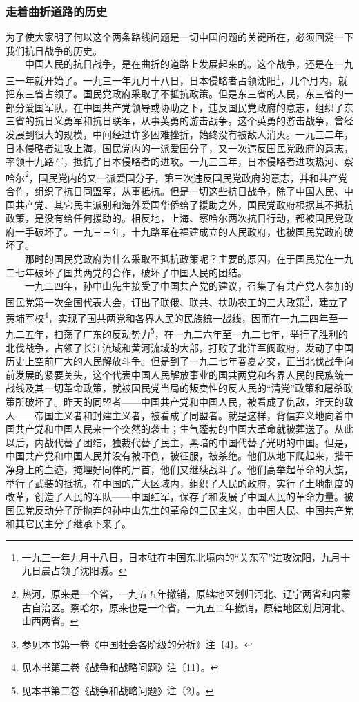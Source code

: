 \documentclass[cn,11pt,chinese]{elegantbook}
\def\myformat#1{\hfil\hfil #1}
\begin{document}
\subsubsection*{\myformat{走着曲折道路的历史}}
为了使大家明了何以这个两条路线问题是一切中国问题的关键所在，必须回溯一下我们抗日战争的历史。\\
　　中国人民的抗日战争，是在曲折的道路上发展起来的。这个战争，还是在一九三一年就开始了。一九三一年九月十八日，日本侵略者占领沈阳\footnote[1]{ 一九三一年九月十八日，日本驻在中国东北境内的“关东军”进攻沈阳，九月十九日晨占领了沈阳城。}，几个月内，就把东三省占领了。国民党政府采取了不抵抗政策。但是东三省的人民，东三省的一部分爱国军队，在中国共产党领导或协助之下，违反国民党政府的意志，组织了东三省的抗日义勇军和抗日联军，从事英勇的游击战争。这个英勇的游击战争，曾经发展到很大的规模，中间经过许多困难挫折，始终没有被敌人消灭。一九三二年，日本侵略者进攻上海，国民党内的一派爱国分子，又一次违反国民党政府的意志，率领十九路军，抵抗了日本侵略者的进攻。一九三三年，日本侵略者进攻热河、察哈尔\footnote[2]{ 热河，原来是一个省，一九五五年撤销，原辖地区划归河北、辽宁两省和内蒙古自治区。察哈尔，原来也是一个省，一九五二年撤销，原辖地区划归河北、山西两省。}，国民党内的又一派爱国分子，第三次违反国民党政府的意志，并和共产党合作，组织了抗日同盟军，从事抵抗。但是一切这些抗日战争，除了中国人民、中国共产党、其它民主派别和海外爱国华侨给了援助之外，国民党政府根据其不抵抗政策，是没有给任何援助的。相反地，上海、察哈尔两次抗日行动，都被国民党政府一手破坏了。一九三三年，十九路军在福建成立的人民政府，也被国民党政府破坏了。\\
　　那时的国民党政府为什么采取不抵抗政策呢？主要的原因，在于国民党在一九二七年破坏了国共两党的合作，破坏了中国人民的团结。\\
　　一九二四年，孙中山先生接受了中国共产党的建议，召集了有共产党人参加的国民党第一次全国代表大会，订出了联俄、联共、扶助农工的三大政策\footnote[3]{ 参见本书第一卷《中国社会各阶级的分析》注〔4〕。}，建立了黄埔军校\footnote[4]{ 见本书第二卷《战争和战略问题》注〔11〕。}，实现了国共两党和各界人民的民族统一战线，因而在一九二四年至一九二五年，扫荡了广东的反动势力\footnote[5]{ 见本书第二卷《战争和战略问题》注〔2〕。}，在一九二六年至一九二七年，举行了胜利的北伐战争，占领了长江流域和黄河流域的大部，打败了北洋军阀政府，发动了中国历史上空前广大的人民解放斗争。但是到了一九二七年春夏之交，正当北伐战争向前发展的紧要关头，这个代表中国人民解放事业的国共两党和各界人民的民族统一战线及其一切革命政策，就被国民党当局的叛卖性的反人民的“清党”政策和屠杀政策所破坏了。昨天的同盟者——中国共产党和中国人民，被看成了仇敌，昨天的敌人——帝国主义者和封建主义者，被看成了同盟者。就是这样，背信弃义地向着中国共产党和中国人民来一个突然的袭击；生气蓬勃的中国大革命就被葬送了。从此以后，内战代替了团结，独裁代替了民主，黑暗的中国代替了光明的中国。但是，中国共产党和中国人民并没有被吓倒，被征服，被杀绝。他们从地下爬起来，揩干净身上的血迹，掩埋好同伴的尸首，他们又继续战斗了。他们高举起革命的大旗，举行了武装的抵抗，在中国的广大区域内，组织了人民的政府，实行了土地制度的改革，创造了人民的军队——中国红军，保存了和发展了中国人民的革命力量。被国民党反动分子所抛弃的孙中山先生的革命的三民主义，由中国人民、中国共产党和其它民主分子继承下来了。\\
\end{document}
